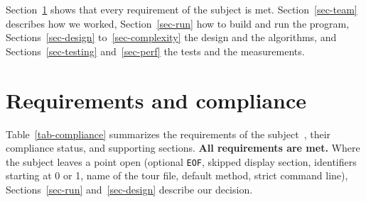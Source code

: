 \documentclass[10pt,a4paper]{article}
\makeatletter
\let\tsp@section\section
\renewcommand{\section}{\FloatBarrier\tsp@section}
\makeatother
\begin{document}
Section~\ref{sec-compliance} shows that every requirement of the subject is met. Section~\ref{sec-team} describes how we worked, Section~\ref{sec-run} how to build and run the program, Sections~\ref{sec-design} to~\ref{sec-complexity} the design and the algorithms, and Sections~\ref{sec-testing} and~\ref{sec-perf} the tests and the measurements.

\section{Requirements and compliance}\label{sec-compliance}

Table~\ref{tab-compliance} summarizes the requirements of the subject~\cite{subject}, their compliance status, and supporting sections. \textbf{All requirements are met.} Where the subject leaves a point open (optional \texttt{EOF}, skipped display section, identifiers starting at 0 or 1, name of the tour file, default method, strict command line), Sections~\ref{sec-run} and~\ref{sec-design} describe our decision.
\end{document}
